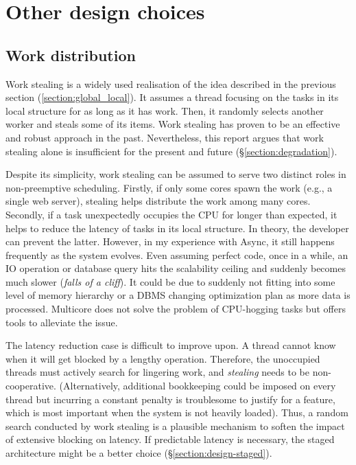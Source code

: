 \documentclass[12pt,a4paper,twoside]{report}
\begin{document}
\section{Other design choices}
\label{section:other_design_choices}

\subsection{Work distribution}
\label{section:work-distribution}

Work stealing is a widely used realisation of the idea described in the previous section (\ref{section:global_local}). It assumes a thread focusing on the tasks in its local structure for as long as it has work. Then, it randomly selects another worker and steals some of its items. Work stealing has proven to be an effective and robust approach in the past. Nevertheless, this report argues that work stealing alone is insufficient for the present and future (\S\ref{section:degradation}). 

Despite its simplicity, work stealing can be assumed to serve two distinct roles in non-preemptive scheduling. Firstly, if only some cores spawn the work (e.g., a single web server), stealing helps distribute the work among many cores. Secondly, if a task unexpectedly occupies the CPU for longer than expected, it helps to reduce the latency of tasks in its local structure. In theory, the developer can prevent the latter. However, in my experience with Async, it still happens frequently as the system evolves. Even assuming perfect code, once in a while, an IO operation or database query hits the scalability ceiling and suddenly becomes much slower (\textit{falls of a cliff}). It could be due to suddenly not fitting into some level of memory hierarchy or a DBMS changing optimization plan as more data is processed. Multicore does not solve the problem of CPU-hogging tasks but offers tools to alleviate the issue.

The latency reduction case is difficult to improve upon. A thread cannot know when it will get blocked by a lengthy operation. Therefore, the unoccupied threads must actively search for lingering work, and \textit{stealing} needs to be non-cooperative. (Alternatively, additional bookkeeping could be imposed on every thread but incurring a constant penalty is troublesome to justify for a feature, which is most important when the system is not heavily loaded). Thus, a random search conducted by work stealing is a plausible mechanism to soften the impact of extensive blocking on latency. If predictable latency is necessary, the staged architecture might be a better choice (\S\ref{section:design-staged}).
\end{document}
